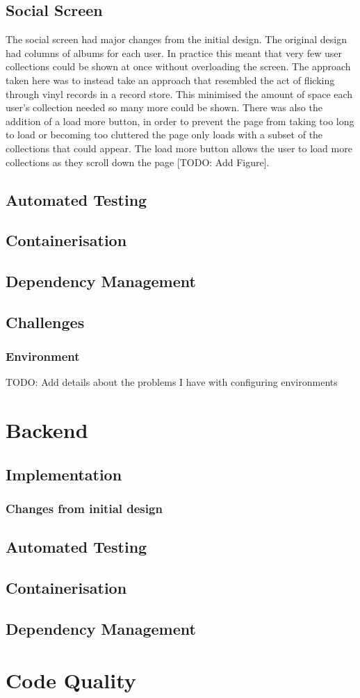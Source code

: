 \subsection{Social Screen}
The social screen had major changes from the initial design. The original design had columns of albums for each user. In practice this meant that very few user collections could be shown at once without overloading the screen. The approach taken here was to instead take an approach that resembled the act of flicking through vinyl records in a record store. This minimised the amount of space each user's collection needed so many more could be shown. There was also the addition of a load more button, in order to prevent the page from taking too long to load or becoming too cluttered the page only loads with a subset of the collections that could appear. The load more button allows the user to load more collections as they scroll down the page [TODO: Add Figure].

\subsection{Automated Testing}
\subsection{Containerisation}
\subsection{Dependency Management}
\subsection{Challenges}
\subsubsection{Environment}
TODO: Add details about the problems I have with configuring environments

\section{Backend}
\subsection{Implementation}
\subsubsection{Changes from initial design}
\subsection{Automated Testing}
\subsection{Containerisation}
\subsection{Dependency Management}

\section{Code Quality} \label{sec:code-quality}
